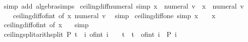 \begin{isabellebody}
\ {\isacharparenleft}{\kern0pt}simp\ add{\isacharcolon}{\kern0pt}\ algebra{\isacharunderscore}{\kern0pt}simps{\isacharparenright}{\kern0pt}%
\endisatagproof
{\isafoldproof}%
%
\isadelimproof
\isanewline
%
\endisadelimproof
\isanewline
{}\isamarkupfalse%
\ ceiling{\isacharunderscore}{\kern0pt}diff{\isacharunderscore}{\kern0pt}numeral\ {\isacharbrackleft}{\kern0pt}simp{\isacharbrackright}{\kern0pt}{\isacharcolon}{\kern0pt}\ {\isachardoublequoteopen}{\isasymlceil}x\ {\isacharminus}{\kern0pt}\ numeral\ v{\isasymrceil}\ {\isacharequal}{\kern0pt}\ {\isasymlceil}x{\isasymrceil}\ {\isacharminus}{\kern0pt}\ numeral\ v{\isachardoublequoteclose}\isanewline
%
\isadelimproof
\ \ %
\endisadelimproof
%
\isatagproof
{}\isamarkupfalse%
\ ceiling{\isacharunderscore}{\kern0pt}diff{\isacharunderscore}{\kern0pt}of{\isacharunderscore}{\kern0pt}int\ {\isacharbrackleft}{\kern0pt}of\ x\ {\isachardoublequoteopen}numeral\ v{\isachardoublequoteclose}{\isacharbrackright}{\kern0pt}\ \isamarkupfalse%
\ simp%
\endisatagproof
{\isafoldproof}%
%
\isadelimproof
\isanewline
%
\endisadelimproof
\isanewline
{}\isamarkupfalse%
\ ceiling{\isacharunderscore}{\kern0pt}diff{\isacharunderscore}{\kern0pt}one\ {\isacharbrackleft}{\kern0pt}simp{\isacharbrackright}{\kern0pt}{\isacharcolon}{\kern0pt}\ {\isachardoublequoteopen}{\isasymlceil}x\ {\isacharminus}{\kern0pt}\ {}{\isasymrceil}\ {\isacharequal}{\kern0pt}\ {\isasymlceil}x{\isasymrceil}\ {\isacharminus}{\kern0pt}\ {}{\isachardoublequoteclose}\isanewline
%
\isadelimproof
\ \ %
\endisadelimproof
%
\isatagproof
{}\isamarkupfalse%
\ ceiling{\isacharunderscore}{\kern0pt}diff{\isacharunderscore}{\kern0pt}of{\isacharunderscore}{\kern0pt}int\ {\isacharbrackleft}{\kern0pt}of\ x\ {}{\isacharbrackright}{\kern0pt}\ \isamarkupfalse%
\ simp%
\endisatagproof
{\isafoldproof}%
%
\isadelimproof
\isanewline
%
\endisadelimproof
\isanewline
{}\isamarkupfalse%
\ ceiling{\isacharunderscore}{\kern0pt}split{\isacharbrackleft}{\kern0pt}arith{\isacharunderscore}{\kern0pt}split{\isacharbrackright}{\kern0pt}{\isacharcolon}{\kern0pt}\ {\isachardoublequoteopen}P\ {\isasymlceil}t{\isasymrceil}\ {\isasymlongleftrightarrow}\ {\isacharparenleft}{\kern0pt}{\isasymforall}i{\isachardot}{\kern0pt}\ of{\isacharunderscore}{\kern0pt}int\ i\ {\isacharminus}{\kern0pt}\ {}\ {\isacharless}{\kern0pt}\ t\ {\isasymand}\ t\ {\isasymle}\ of{\isacharunderscore}{\kern0pt}int\ i\ {\isasymlongrightarrow}\ P\ i{\isacharparenright}{\kern0pt}{\isachardoublequoteclose}\isanewline

\end{isabellebody}
